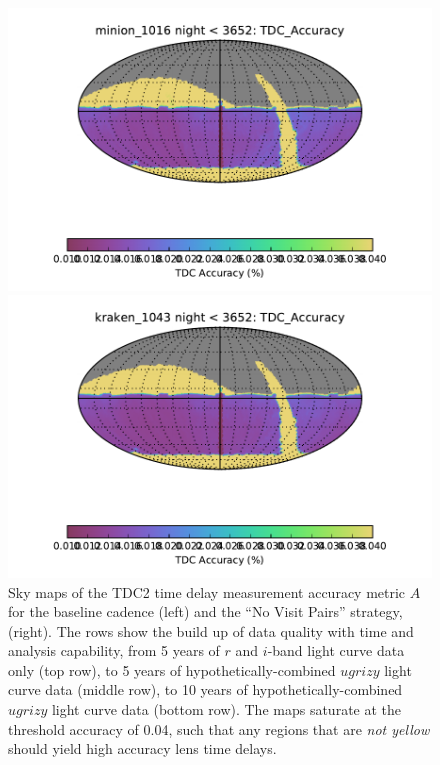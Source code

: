 \begin{figure}[!ht]
\begin{minipage}[b]{\linewidth}
\begin{minipage}[b]{0.48\linewidth}
       \centering\includegraphics[width=\linewidth]{figs/lenstimedelays/minion_1016_TDC_Accuracy_night_lt_3652_HEAL_SkyMap.pdf}
    \end{minipage} \hfill
    \begin{minipage}[b]{0.48\linewidth}
       \centering\includegraphics[width=\linewidth]{figs/lenstimedelays/kraken_1043_TDC_Accuracy_night_lt_3652_HEAL_SkyMap.pdf}
    \end{minipage}
  \end{minipage}
\caption{Sky maps of the TDC2 time delay measurement accuracy metric $A$ for the baseline cadence  (left) and the ``No Visit Pairs'' strategy,  (right). The rows show the build up of data quality with time and analysis capability, from 5 years of $r$ and $i$-band light curve data only (top row), to 5 years of hypothetically-combined $ugrizy$ light curve data (middle row), to 10 years of hypothetically-combined $ugrizy$ light curve data (bottom row). The maps saturate at the threshold accuracy of 0.04, such that any regions that are {\it not yellow} should yield high accuracy lens time delays.}
\label{fig:lenstimedelays:accuracymaps}
\end{figure}


